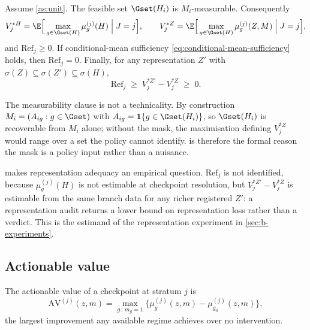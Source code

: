 \begin{theorem}
\label{thm:refinement}
Assume \cref{as:unit}.  The feasible set $\Gset(H_i)$ is $M_i$-measurable.  Consequently
\begin{equation}
 V^{*H}_j=\E\Big[\max_{g\in\Gset(H)}\mu^{(j)}_g(H)\;\Big|\;J=j\Big],
 \qquad
 V^{*Z}_j=\E\Big[\max_{g\in\Gset(H)}\mu^{(j)}_g(Z,M)\;\Big|\;J=j\Big],
\end{equation}
and $\mathrm{Ref}_j\ge 0$.  If conditional-mean sufficiency
\eqref{eq:conditional-mean-sufficiency} holds, then $\mathrm{Ref}_j=0$.
Finally, for any representation $Z'$ with $\sigma(Z)\subseteq\sigma(Z')\subseteq
\sigma(H)$,
\begin{equation}
 \mathrm{Ref}_j\;\ge\;V^{*Z'}_j-V^{*Z}_j\;\ge\;0 .
 \label{eq:refinement-bound}
\end{equation}
\end{theorem}

The measurability clause is not a technicality.  By construction
$M_i=(A_{ig}:g\in\Gset)$ with $A_{ig}=\mathbf 1\{g\in\Gset(H_i)\}$, so
$\Gset(H_i)$ is recoverable from $M_i$ alone; without the mask, the maximisation
defining $V^{*Z}_j$ would range over a set the policy cannot identify.
 is therefore the formal reason the mask is a policy input
rather than a nuisance.

 makes representation adequacy an empirical question.
$\mathrm{Ref}_j$ is not identified, because $\mu^{(j)}_g(H)$ is not estimable at
checkpoint resolution, but $V^{*Z'}_j-V^{*Z}_j$ is estimable from the same
branch data for any richer registered $Z'$: a representation audit returns a
lower bound on representation loss rather than a verdict.  This is the estimand
of the representation experiment in \cref{sec:b-experiments}.

\subsection{Actionable value}

\begin{definition}
\label{def:actionable}
The actionable value of a checkpoint at stratum $j$ is
\begin{equation}
 \mathrm{AV}^{(j)}(z,m)=\max_{g\,:\,m_g=1}\big\{\mu^{(j)}_g(z,m)-\mu^{(j)}_{g_0}(z,m)\big\},
 \label{eq:actionable}
\end{equation}
the largest improvement any available regime achieves over no intervention.
\end{definition}

